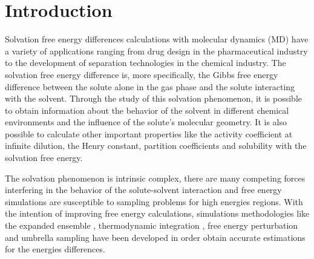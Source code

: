 \chapter{Introduction} %

\label{Chapter1} %

Solvation free energy differences calculations with molecular dynamics (MD) have a variety of applications ranging from drug design in the pharmaceutical industry  to the development of separation technologies in the chemical industry. The solvation free energy difference is, more specifically, the Gibbs free energy difference between the solute alone in the gas phase and the solute interacting with the solvent. Through the study of this solvation phenomenon, it is possible to obtain  information about the behavior of the solvent in different chemical environments and the influence of the solute's molecular geometry. It is also possible to calculate other important properties like the activity coefficient at infinite dilution, the Henry constant, partition coefficients and solubility with the solvation free energy. 

The solvation phenomenon is intrinsic complex, there are many competing forces interfering in the behavior of the solute-solvent interaction and free energy simulations are susceptible to sampling problems for high energies regions. With the intention of improving free energy calculations, simulations methodologies like the expanded ensemble \cite{lyubartsev}, thermodynamic integration \cite{kirkwood1935}, free energy perturbation \cite{zwanzig1954,bennet1976,mbar} and umbrella sampling \cite{TORRIE1977187} have been developed in order obtain accurate estimations for the energies differences. 

